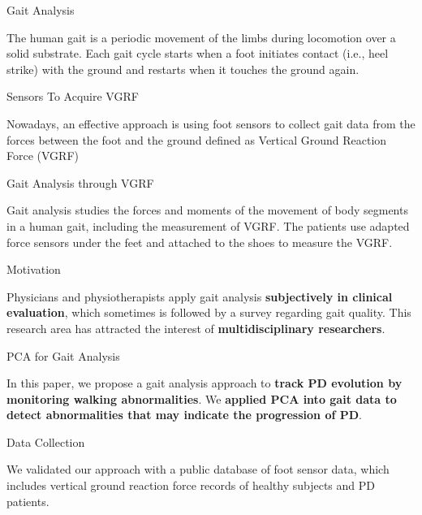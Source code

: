 \documentclass{beamer}
\begin{document}
\begin{frame}{Gait Analysis}
  \begin{block}{}
The human gait is a periodic movement of the limbs during locomotion over a solid substrate. Each gait cycle starts when a foot initiates contact (i.e., heel strike) with the ground and restarts when it touches the ground again.
	\end{block}
\end{frame}

\begin{frame}{Sensors To Acquire VGRF}
  \begin{block}{}
Nowadays, an effective approach is using foot sensors to collect gait data from the forces between the foot and the ground defined as Vertical Ground Reaction Force (VGRF)
  \end{block}
\end{frame}

\begin{frame}{Gait Analysis through VGRF}
  \begin{block}{}
Gait analysis studies the forces and moments of the movement of body segments in a human gait, including the measurement of VGRF. The patients use adapted force sensors under the feet and attached to the shoes to measure the VGRF.
	\end{block}
\end{frame}

\begin{frame}{Motivation}
\begin{block}{}
	Physicians and physiotherapists apply gait analysis \textbf{subjectively in clinical evaluation}, which sometimes is followed by a survey regarding gait quality. This research area has attracted the interest of \textbf{multidisciplinary researchers}.
	\end{block}
\end{frame}

\begin{frame}{PCA for Gait Analysis}
  \begin{block}{}
In this paper, we propose a gait analysis approach to \textbf{track PD evolution by monitoring walking abnormalities}. We \textbf{applied PCA into gait data to detect abnormalities that may indicate the progression of PD}.
  \end{block}
\end{frame}

\begin{frame}{Data Collection}
	\begin{block}{}
	We validated our approach with a public database of foot sensor data, which includes vertical ground reaction force records of healthy subjects and PD patients.
	\end{block}
\end{frame}
\end{document}
